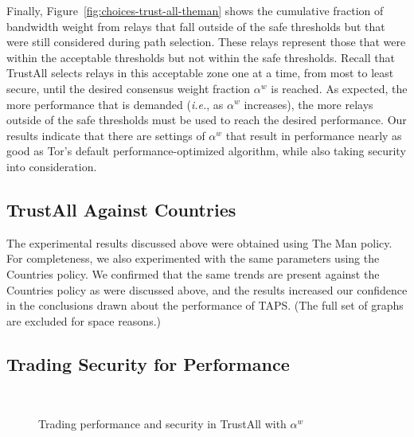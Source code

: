 \documentclass[conference]{styles/IEEEtran}
\newcommand{\ie}{\emph{i.e.}}
\newcommand{\ps}{TAPS\xspace}
\begin{document}
Finally, Figure~\ref{fig:choices-trust-all-theman} shows the cumulative fraction
of bandwidth weight from relays that fall outside of the safe thresholds but
that were still considered during path selection. These relays represent those
that were within the acceptable thresholds but not within the safe thresholds.
Recall that TrustAll selects relays in this acceptable zone one at a time, from most
to least secure, until the desired consensus weight fraction $\alpha^w$ is
reached. As expected, the more performance that is demanded (\ie{}, as
$\alpha^w$ increases), the more relays outside of the safe thresholds must be
used to reach the desired performance. Our results indicate that there are settings
of $\alpha^w$ that result in performance nearly as good as Tor's default
performance-optimized algorithm, while also taking security into consideration.

\subsection{TrustAll Against \textsf{Countries}}

The experimental results discussed above were obtained using \textsf{The Man} policy. For
completeness, we also experimented with the same parameters using the \textsf{Countries}
policy.
We confirmed that the same trends are present against the \textsf{Countries} policy as were
discussed above, and the results increased our confidence in the conclusions drawn about
the performance of \ps. (The full set of graphs are excluded for space reasons.)

\subsection{Trading Security for Performance}

\begin{figure}[t]
    \centering
    \vspace{-2mm}
    \\
    \vspace{-2mm}
    \caption{\small Trading performance and security in TrustAll with $\alpha^w$}
    \vspace{-4mm}
    \label{fig:tradeoffs}
\end{figure}
\end{document}
